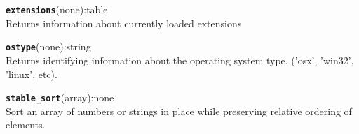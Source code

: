 \hrulefill

\texttt{{\large\textbf{extensions}}}\textsf{(none):table}\\
 Returns information about currently loaded extensions

\hrulefill

\texttt{{\large\textbf{ostype}}}\textsf{(none):string}\\
 Returns identifying information about the operating system type. ('osx', 'win32', 'linux', etc).

\hrulefill

\texttt{{\large\textbf{stable\_sort}}}\textsf{(array):none}\\
 Sort an array of numbers or strings in place while preserving relative ordering of elements.

